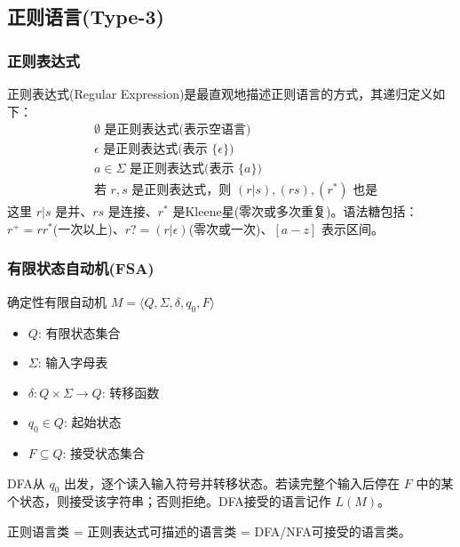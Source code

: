 \subsection{正则语言(Type-3)}

\subsubsection{正则表达式}

正则表达式(Regular Expression)是最直观地描述正则语言的方式，其递归定义如下：
\begin{equation}
    \begin{aligned}
    &\emptyset \text{ 是正则表达式(表示空语言)} \\
    &\epsilon \text{ 是正则表达式(表示 } \{\epsilon\} \text{)} \\
    &a \in \Sigma \text{ 是正则表达式(表示 } \{a\} \text{)} \\
    &\text{若 } r, s \text{ 是正则表达式，则 } (r|s), (rs), (r^*) \text{ 也是}
    \end{aligned}
\end{equation}
这里 $r|s$ 是并、$rs$ 是连接、$r^*$ 是Kleene星(零次或多次重复)。语法糖包括：$r^+ = rr^*$(一次以上)、$r? = (r|\epsilon)$(零次或一次)、$[a-z]$ 表示区间。

\subsubsection{有限状态自动机(FSA)}

\begin{definition}[DFA]
确定性有限自动机 $M = \langle Q, \Sigma, \delta, q_0, F \rangle$
\begin{itemize}
    \item $Q$: 有限状态集合
    \item $\Sigma$: 输入字母表
    \item $\delta: Q \times \Sigma \rightarrow Q$: 转移函数
    \item $q_0 \in Q$: 起始状态
    \item $F \subseteq Q$: 接受状态集合
\end{itemize}
\end{definition}

DFA从 $q_0$ 出发，逐个读入输入符号并转移状态。若读完整个输入后停在 $F$ 中的某个状态，则接受该字符串；否则拒绝。DFA接受的语言记作 $L(M)$。

\begin{theorem}[克莱因定理]
正则语言类 = 正则表达式可描述的语言类 = DFA/NFA可接受的语言类。
\end{theorem}

